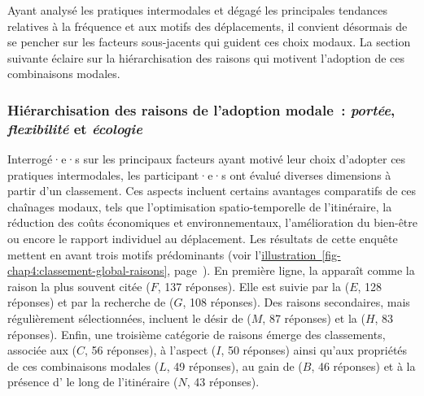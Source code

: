 \begin{refsegment}
Ayant analysé les pratiques intermodales et dégagé les principales tendances relatives à la fréquence et aux motifs des déplacements, il convient désormais de se pencher sur les facteurs sous-jacents qui guident ces choix modaux. La section suivante éclaire sur la hiérarchisation des raisons qui motivent l'adoption de ces combinaisons modales.%

\subsubsection*{Hiérarchisation des raisons de l'adoption modale~: \textsl{portée}, \textsl{flexibilité} et \textsl{écologie}
    \label{chap4:raisons-adoption}
    }

Interrogé·e·s sur les principaux facteurs ayant motivé leur choix d'adopter ces pratiques intermodales, les participant·e·s ont évalué diverses dimensions à partir d'un classement. Ces aspects incluent certains avantages comparatifs de ces chaînages modaux, tels que l'optimisation spatio-temporelle de l'\gls{itinéraire}, la réduction des coûts économiques et environnementaux, l'amélioration du bien-être ou encore le rapport individuel au déplacement. Les résultats de cette enquête mettent en avant trois motifs prédominants (voir l'\hyperref[fig-chap4:classement-global-raisons]{illustration~\ref{fig-chap4:classement-global-raisons}}, page~\pageref{fig-chap4:classement-global-raisons}). En première ligne, la  apparaît comme la raison la plus souvent citée (\(F\), 137 réponses). Elle est suivie par la  (\(E\), 128 réponses) et par la recherche de  (\(G\), 108 réponses). Des raisons secondaires, mais régulièrement sélectionnées, incluent le désir de  (\(M\), 87 réponses) et la  (\(H\), 83 réponses). Enfin, une troisième catégorie de raisons émerge des classements, associée aux  (\(C\), 56 réponses), à l'aspect  (\(I\), 50 réponses) ainsi qu'aux propriétés  de ces combinaisons modales (\(L\), 49 réponses), au gain de  (\(B\), 46 réponses) et à la présence d' le long de l'itinéraire (\(N\), 43 réponses).%


\end{refsegment}
